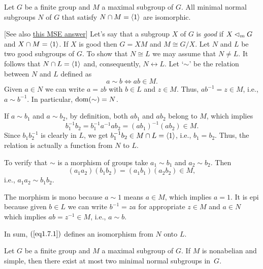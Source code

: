 \begin{exr}
     Let\/ $G$ be a finite group and\/ $M$ a maximal subgroup of\/ $G$. All minimal normal subgroups\/ $N$ of\/ $G$ that satisfy\/ $N\cap M=\langle1\rangle$ are isomorphic.
\end{exr}

\begin{solution}
    {[See also \href{https://math.stackexchange.com/a/2694761/269050}{this MSE answer}]} Let's say that a subgroup $X$ of $G$ is \textsl{good\/} if $X\lhd_mG$ and $X\cap M=\langle1\rangle$. If $X$ is good then $G=XM$ and $M\cong G/X$. Let $N$ and $L$ be two good subgroups of $G$. To show that $N\cong L$ we may assume that $N\ne L$. It follows that $N\cap L=\langle1\rangle$ and, consequently, $N\leftrightarrow L$. Let `$\sim$' be the relation between $N$ and $L$ defined as
    \begin{equation}\label{eq1.7.1}
        a \sim b\iff ab\in M.
    \end{equation}
    Given $a\in N$ we can write $a=zb$ with $b\in L$ and $z\in M$. Thus, $ab^{-1}=z\in M$, i.e., $a\sim b^{-1}$. In particular, $\operatorname{dom}(\sim)=N$.
    
    If $a\sim b_1$ and $a\sim b_2$, by definition, both $ab_1$ and $ab_2$ belong to $M$, which implies
    $$
        b_1^{-1}b_2 = b_1^{-1}a^{-1}ab_2 = (ab_1)^{-1}(ab_2)\in M.
    $$
    Since $b_1b_2^{-1}$ is clearly in $L$, we get $b_1^{-1}b_2\in M\cap L=\langle1\rangle$, i.e., $b_1=b_2$. Thus, the relation is actually a function from $N$ to $L$.
    
    To verify that $\sim$ is a morphism of groups take $a_1\sim b_1$ and $a_2\sim b_2$. Then
    $$
        (a_1a_2)(b_1b_2) = (a_1b_1)(a_2b_2)\in M,
    $$
    i.e., $a_1a_2\sim b_1b_2$.
    
    The morphism is mono because $a\sim 1$ means $a\in M$, which implies $a=1$. It is epi because given $b\in L$ we can write $b^{-1}=za$ for appropriate $z\in M$ and $a\in N$ which implies $ab=z^{-1}\in M$, i.e., $a\sim b$.
    
    In sum, $(\ref{eq1.7.1})$ defines an isomorphism from $N$ onto $L$.
\end{solution}

\begin{exr}
    Let\/ $G$ be a finite group and\/ $M$ a maximal subgroup of\/ $G$. If\/ $M$ is nonabelian and simple, then there exist at most two minimal normal subgroups in\/~$G$.
\end{exr}

